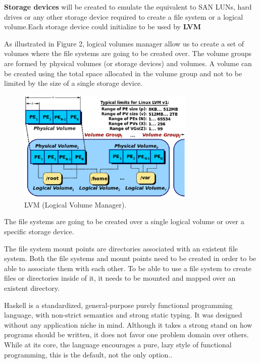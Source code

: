 \documentclass{aes2e}
\begin{document}
\textbf{Storage devices} will be created to emulate the equivalent to SAN LUNs, hard drives or any other storage device required to create a file system or a logical volume.Each storage device could initialize to be used by \textbf{LVM}\cite{DEK2} \newline

As illustrated in  Figure 2, logical volumes manager allow us to create a set of volumes where the file systems are going to be created over. The volume groups are formed by physical volumes (or storage devices) and volumes. A volume can be created using the total space allocated in the volume group and not to be limited by the size of a single storage device.\cite{DEK2} \newline

\begin{figure}[ht]
\centering
\includegraphics[width=20pc]{LVM.eps}
\caption{LVM (Logical Volume Manager).\cite{DEK4}}
\end{figure}

The file systems are going to be created over a single logical volume or over a specific storage device. \newline

The file system mount points are directories associated with an existent file system. Both the file systems and mount points need to be created in order to be able to associate them with each other.
To be able to use a file system to create files or directories inside of it, it needs to be mounted and mapped over an existent directory.\cite{DEK2} \newline

Haskell is a standardized, general-purpose purely functional programming language, with non-strict semantics and strong static typing. It was designed without any application niche in
mind. Although it takes a strong stand on how programs should be written, it does not favor one problem domain over others. While at its core, the language encourages a pure, lazy style of functional programming, this is the default, not the only option.\newline.
\end{document}
